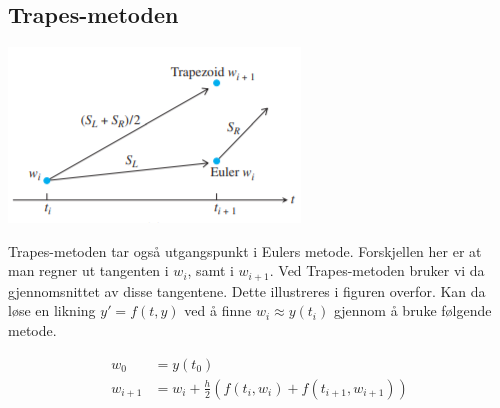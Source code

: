 \subsection{Trapes-metoden}
\begin{center}
    \includegraphics{rapport/metode/bilder/trapezoid.PNG}
\end{center}
Trapes-metoden tar også utgangspunkt i Eulers metode. Forskjellen her er at man regner ut tangenten i $w_i$, samt i $w_{i+1}$. Ved Trapes-metoden bruker vi da gjennomsnittet av disse tangentene. Dette illustreres i figuren overfor.\newline\newline
Kan da løse en likning $y' = f(t, y)$ ved å finne $w_i \approx y(t_i)$ gjennom å bruke følgende metode.

\begin{equation}
\begin{aligned}
    w_0&=y(t_0)\\
    w_{i+1}&=w_i + \frac{h}{2}(f(t_i, w_i)+f(t_{i+1}, w_{i+1}))
\end{aligned}
\end{equation}